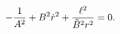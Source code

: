 \begin{equation}
-{1\over A^{2}}+B^{2}\dot{r}^{2}
+{\ell^{2}\over \tilde{B}^{2}r^{2}}=0.
\label{eq:massless}
\end{equation}

